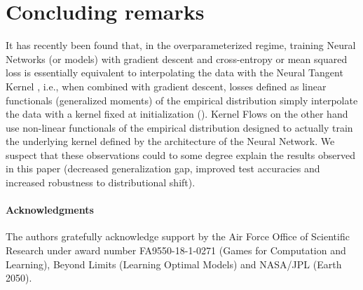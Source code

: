 \documentclass[11pt]{article}
\begin{document}
\section{Concluding remarks}
It has recently been found \cite{jacot2018neural, lee2019wide} that, in the overparameterized regime, training Neural Networks (or models)  with gradient descent and cross-entropy or mean squared loss is essentially equivalent to interpolating the data with the Neural Tangent Kernel , i.e., when combined with gradient descent, losses defined as linear functionals (generalized moments) of the empirical distribution simply interpolate the data with a kernel fixed at initialization ().
Kernel Flows on the other hand use non-linear functionals of the empirical distribution  designed to actually train the underlying kernel defined by the architecture of the Neural Network.
We suspect that these observations could to some degree explain the results observed in this paper (decreased generalization gap, improved test accuracies and increased robustness to distributional shift).



\paragraph{Acknowledgments}
The authors gratefully acknowledge support by  the Air Force Office of Scientific Research under award number FA9550-18-1-0271 (Games for Computation and Learning), Beyond Limits (Learning Optimal Models) and NASA/JPL (Earth 2050).





\end{document}
